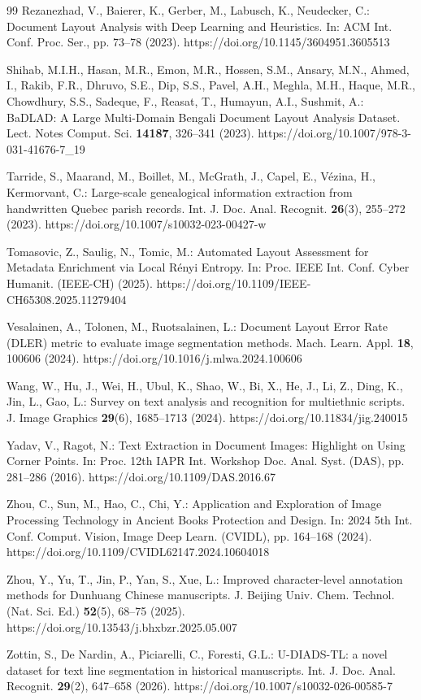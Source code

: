 \documentclass[pdflatex,sn-mathphys-num]{sn-jnl}
\begin{document}
\begin{thebibliography}{99}
Rezanezhad, V., Baierer, K., Gerber, M., Labusch, K., Neudecker, C.: Document Layout Analysis with Deep Learning and Heuristics. In: ACM Int. Conf. Proc. Ser., pp. 73--78 (2023). https://doi.org/10.1145/3604951.3605513

Shihab, M.I.H., Hasan, M.R., Emon, M.R., Hossen, S.M., Ansary, M.N., Ahmed, I., Rakib, F.R., Dhruvo, S.E., Dip, S.S., Pavel, A.H., Meghla, M.H., Haque, M.R., Chowdhury, S.S., Sadeque, F., Reasat, T., Humayun, A.I., Sushmit, A.: BaDLAD: A Large Multi-Domain Bengali Document Layout Analysis Dataset. Lect. Notes Comput. Sci. \textbf{14187}, 326--341 (2023). https://doi.org/10.1007/978-3-031-41676-7\_19

Tarride, S., Maarand, M., Boillet, M., McGrath, J., Capel, E., Vézina, H., Kermorvant, C.: Large-scale genealogical information extraction from handwritten Quebec parish records. Int. J. Doc. Anal. Recognit. \textbf{26}(3), 255--272 (2023). https://doi.org/10.1007/s10032-023-00427-w

Tomasovic, Z., Saulig, N., Tomic, M.: Automated Layout Assessment for Metadata Enrichment via Local Rényi Entropy. In: Proc. IEEE Int. Conf. Cyber Humanit. (IEEE-CH) (2025). https://doi.org/10.1109/IEEE-CH65308.2025.11279404

Vesalainen, A., Tolonen, M., Ruotsalainen, L.: Document Layout Error Rate (DLER) metric to evaluate image segmentation methods. Mach. Learn. Appl. \textbf{18}, 100606 (2024). https://doi.org/10.1016/j.mlwa.2024.100606

Wang, W., Hu, J., Wei, H., Ubul, K., Shao, W., Bi, X., He, J., Li, Z., Ding, K., Jin, L., Gao, L.: Survey on text analysis and recognition for multiethnic scripts. J. Image Graphics \textbf{29}(6), 1685--1713 (2024). https://doi.org/10.11834/jig.240015

Yadav, V., Ragot, N.: Text Extraction in Document Images: Highlight on Using Corner Points. In: Proc. 12th IAPR Int. Workshop Doc. Anal. Syst. (DAS), pp. 281--286 (2016). https://doi.org/10.1109/DAS.2016.67

Zhou, C., Sun, M., Hao, C., Chi, Y.: Application and Exploration of Image Processing Technology in Ancient Books Protection and Design. In: 2024 5th Int. Conf. Comput. Vision, Image Deep Learn. (CVIDL), pp. 164--168 (2024). https://doi.org/10.1109/CVIDL62147.2024.10604018

Zhou, Y., Yu, T., Jin, P., Yan, S., Xue, L.: Improved character-level annotation methods for Dunhuang Chinese manuscripts. J. Beijing Univ. Chem. Technol. (Nat. Sci. Ed.) \textbf{52}(5), 68--75 (2025). https://doi.org/10.13543/j.bhxbzr.2025.05.007

Zottin, S., De Nardin, A., Piciarelli, C., Foresti, G.L.: U-DIADS-TL: a novel dataset for text line segmentation in historical manuscripts. Int. J. Doc. Anal. Recognit. \textbf{29}(2), 647--658 (2026). https://doi.org/10.1007/s10032-026-00585-7

\end{thebibliography}
\end{document}
